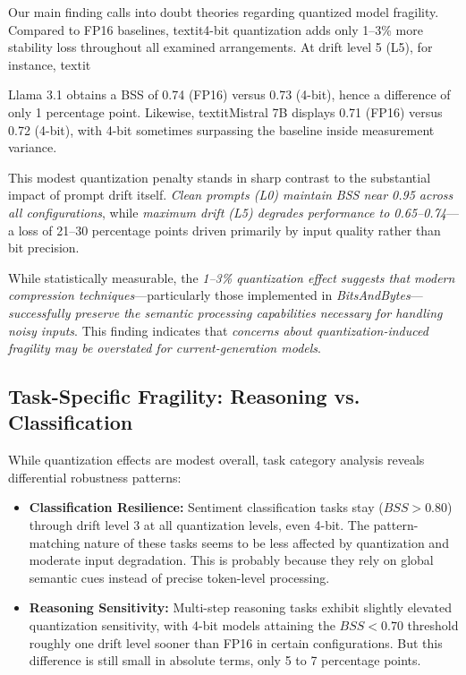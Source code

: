 \documentclass[conference]{IEEEtran}
\begin{document}
Our main finding calls into doubt theories regarding quantized model fragility. Compared to FP16 baselines, textit{4-bit quantization adds only 1--3\% more stability loss throughout all examined arrangements}. At drift level 5 (L5), for instance, textit{Llama 3.1 obtains a BSS of 0.74 (FP16) versus 0.73 (4-bit), hence a difference of only 1 percentage point. Likewise, textit{Mistral 7B displays 0.71 (FP16) versus 0.72 (4-bit)}, with 4-bit sometimes surpassing the baseline inside measurement variance.

This modest quantization penalty stands in sharp contrast to the substantial impact of prompt drift itself. \textit{Clean prompts (L0) maintain BSS near 0.95 across all configurations}, while \textit{maximum drift (L5) degrades performance to 0.65--0.74}---a loss of 21--30 percentage points driven primarily by input quality rather than bit precision.

While statistically measurable, the \textit{1--3\% quantization effect suggests that modern compression techniques}---particularly those implemented in \textit{BitsAndBytes}---\textit{successfully preserve the semantic processing capabilities necessary for handling noisy inputs}. This finding indicates that \textit{concerns about quantization-induced fragility may be overstated for current-generation models}.

\subsection{Task-Specific Fragility: Reasoning vs. Classification}

While quantization effects are modest overall, task category analysis reveals differential robustness patterns:

\begin{itemize}
\item \textbf{Classification Resilience:} Sentiment classification tasks stay ($BSS > 0.80$) through drift level 3 at all quantization levels, even 4-bit. The pattern-matching nature of these tasks seems to be less affected by quantization and moderate input degradation. This is probably because they rely on global semantic cues instead of precise token-level processing.

\item \textbf{Reasoning Sensitivity:} Multi-step reasoning tasks exhibit slightly elevated quantization sensitivity, with 4-bit models attaining the $BSS < 0.70$ threshold roughly one drift level sooner than FP16 in certain configurations. But this difference is still small in absolute terms, only 5 to 7 percentage points.


\end{itemize}}
\end{document}
